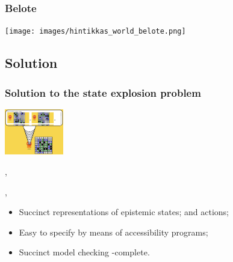 \begin{frame}
	\frametitle{Belote}
	\begin{center}
		\texttt{[image: images/hintikkas\_world\_belote.png]}
	
	\end{center}

\end{frame}

\subsection{Solution}

\begin{frame}
\frametitle{Solution to the state explosion problem}

\begin{center}
	\includegraphics[height=2cm]{images/HW_minesweeper_easy.png}
\end{center}

\vfill
{}, 

\vfill
\begin{block}{ , }
	\begin{itemize}
		\item Succinct representations of epistemic states; {and} actions;
		\item Easy to specify by means of accessibility programs;
		\item Succinct model checking \PSPACE-complete.
	\end{itemize}
\end{block}

\end{frame}



